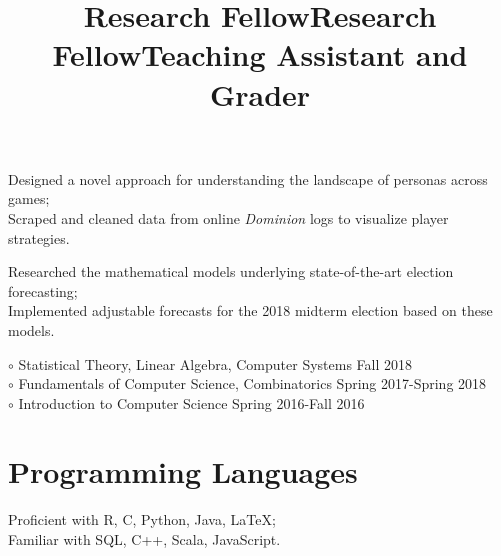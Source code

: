 \documentclass[margin]{res}
\begin{document}
\begin{resume}
\title{\textbf{Research Fellow}}
\begin{position}
Designed a novel approach for understanding the landscape of personas across games;\\
Scraped and cleaned data from online \emph{Dominion} logs to visualize player strategies.
\end{position}

\title{\textbf{Research Fellow}}
\begin{position}
Researched the mathematical models underlying state-of-the-art election forecasting;\\
Implemented adjustable forecasts for the 2018 midterm election based on these models.
\end{position}

\dates{}
\title{\textbf{Teaching Assistant and Grader}}
\begin{position}
$\circ$ Statistical Theory, Linear Algebra, Computer Systems \hfill Fall 2018\\
$\circ$  Fundamentals of Computer Science, Combinatorics \hfill Spring 2017-Spring 2018\\
$\circ$ Introduction to Computer Science \hfill Spring 2016-Fall 2016
\end{position}



\section{Programming Languages}

Proficient with R, C, Python, Java, \LaTeX;\\ Familiar with SQL, C++, Scala, JavaScript.



\end{resume}
\end{document}
